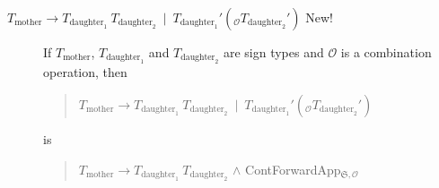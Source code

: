 \begin{description}





  

\item[\textnormal{$T_{\text{mother}}\longrightarrow
    T_{\text{daughter}_1}\ T_{\text{daughter}_2}\ \mid\
    T_{\text{daughter}_1}'(_{\mathcal{O}}T_{\text{daughter}_2}')$}
  New!] \mbox{}

  If $T_{\text{mother}}$, $T_{\text{daughter}_1}$ and
  $T_{\text{daughter}_2}$ are sign types and $\mathcal{O}$ is a
  combination operation, then
  \begin{quote}
    $T_{\text{mother}}\longrightarrow
    T_{\text{daughter}_1}\ T_{\text{daughter}_2}\ \mid\
    T_{\text{daughter}_1}'(_{\mathcal{O}}T_{\text{daughter}_2}')$
  \end{quote}
  is
  \begin{quote}
  $T_{\text{mother}}\longrightarrow
    T_{\text{daughter}_1}\ T_{\text{daughter}_2}$ \d{\d{$\wedge$}}
    ContForwardApp$_{\mathfrak{S},\mathcal{O}}$
  \end{quote}


\end{description}
